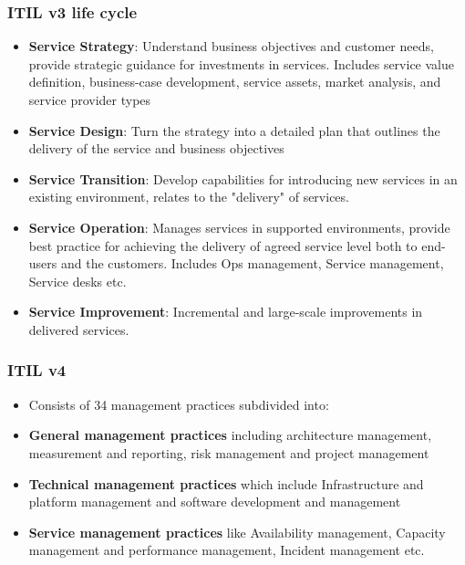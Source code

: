 \documentclass{article}
\begin{document}
\subsubsection{ITIL v3 life cycle}
\begin{itemize}
    \item \textbf{Service Strategy}: Understand business objectives and customer needs, provide strategic guidance for investments in services. Includes service value definition, business-case development, service assets, market analysis, and service provider types
    
    \item \textbf{Service Design}: Turn the strategy into a detailed plan that outlines the delivery of the service and business objectives
    
    \item \textbf{Service Transition}: Develop capabilities for introducing new services in an existing environment, relates to the "delivery" of services. 
    
    \item \textbf{Service Operation}: Manages services in supported environments,  provide best practice for achieving the delivery of agreed service level both to end-users and the customers. Includes Ops management, Service management, Service desks etc.
    
    \item \textbf{Service Improvement}: Incremental and large-scale improvements in delivered services. 
\end{itemize}

\subsubsection{ITIL v4}
\begin{itemize}
    \item Consists of 34 management practices subdivided into:
   
    \item \textbf{General management practices} including architecture management, measurement and reporting, risk management and project management 
    
    \item \textbf{Technical management practices} which include Infrastructure and platform management and software development and management  
    
    \item \textbf{Service management practices} like Availability management, Capacity management and performance management, Incident management etc.
\end{itemize}
\end{document}
